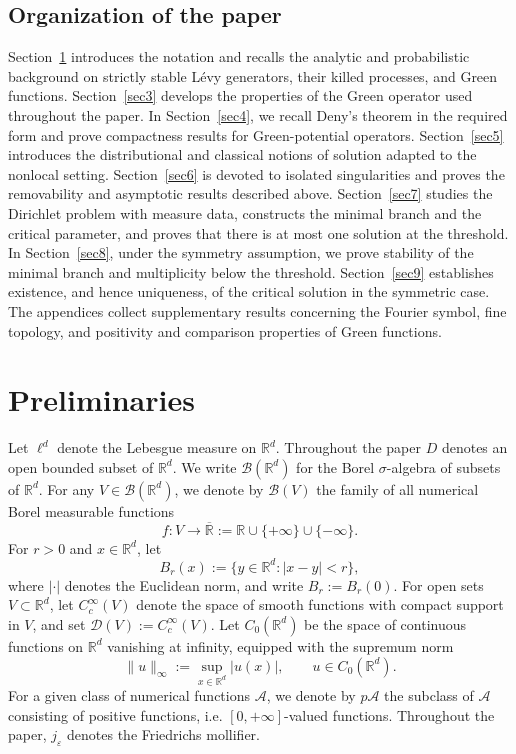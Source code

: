 \documentclass[11pt,a4paper,reqno]{amsart}
\theoremstyle{definition}
\numberwithin{equation}{section}
\begin{document}
\subsection{Organization of the paper}

Section~\ref{sec2} introduces the notation and recalls the analytic and probabilistic background on strictly 
stable L\'evy generators, their killed processes, and Green functions. Section~\ref{sec3} develops the properties of 
the Green operator used throughout the paper. In Section~\ref{sec4}, we recall Deny's theorem in the required form and 
prove compactness results for Green-potential operators. Section~\ref{sec5} introduces the distributional and classical 
notions of solution adapted to the nonlocal setting. Section~\ref{sec6} is devoted to isolated singularities and proves 
the removability and asymptotic results described above. Section~\ref{sec7} studies the Dirichlet problem with measure data, 
constructs the minimal branch and the critical parameter, and proves that there is at most one solution at the threshold. 
In Section~\ref{sec8}, under the symmetry assumption, we prove stability of the minimal branch and multiplicity 
below the threshold. Section~\ref{sec9} establishes existence, and hence uniqueness, of the critical solution in the symmetric case. 
The appendices collect supplementary results concerning the Fourier symbol, fine topology, and positivity and comparison 
properties of Green functions.


\section{Preliminaries}
\label{sec2}
Let $\ell^d$ denote the Lebesgue measure on $\mathbb{R}^d$.  Throughout the paper $D$ denotes an open bounded subset of $\mathbb R^d$.
We write $\mathcal{B}(\mathbb{R}^d)$ for the Borel $\sigma$-algebra of subsets of $\mathbb{R}^d$.
For any $V \in \mathcal{B}(\mathbb{R}^d)$, we denote by $\mathscr{B}(V)$ the family of all numerical Borel measurable functions 
\[
f : V \to \overline{\mathbb{R}} := \mathbb{R} \cup \{+\infty\} \cup \{-\infty\}.
\]
For $r > 0$ and $x \in \mathbb{R}^d$, let
\[
B_r(x) := \{y \in \mathbb{R}^d : |x-y| < r\},
\]
where $|\cdot|$ denotes the Euclidean norm, and write $B_r := B_r(0)$.  
For open sets $V \subset \mathbb{R}^d$, let $C_c^\infty(V)$ denote the space of 
smooth functions with compact support in $V$, 
and set $\mathscr{D}(V) := C_c^\infty(V)$.  
Let $C_0(\mathbb{R}^d)$ be the space of continuous functions on $\mathbb{R}^d$ 
vanishing at infinity, equipped with the supremum norm
\[
\|u\|_\infty := \sup_{x \in \mathbb{R}^d} |u(x)|, \qquad u \in C_0(\mathbb{R}^d).
\]
For a given class of numerical functions $\mathscr{A}$, we denote by $p\mathscr{A}$
 the subclass of $\mathscr{A}$ consisting of positive functions, i.e. $[0,+\infty]$-valued functions.  
 Throughout the paper, $j_\varepsilon$ denotes the Friedrichs mollifier.
\end{document}
